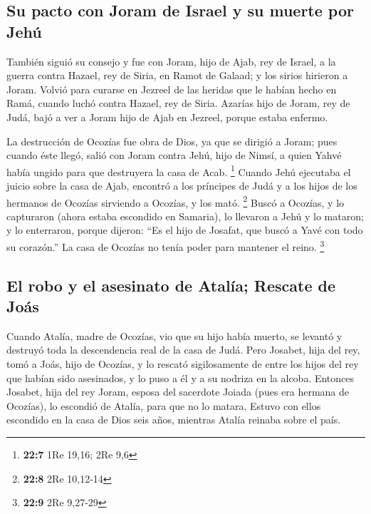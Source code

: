\hypertarget{su-pacto-con-joram-de-israel-y-su-muerte-por-jehuxfa}{%
\subsection{Su pacto con Joram de Israel y su muerte por
Jehú}\label{su-pacto-con-joram-de-israel-y-su-muerte-por-jehuxfa}}

 También siguió su consejo y fue con Joram, hijo de Ajab,
rey de Israel, a la guerra contra Hazael, rey de Siria, en Ramot de
Galaad; y los sirios hirieron a Joram.  Volvió para
curarse en Jezreel de las heridas que le habían hecho en Ramá, cuando
luchó contra Hazael, rey de Siria. Azarías hijo de Joram, rey de Judá,
bajó a ver a Joram hijo de Ajab en Jezreel, porque estaba enfermo.

 La destrucción de Ocozías fue obra de Dios, ya que se
dirigió a Joram; pues cuando éste llegó, salió con Joram contra Jehú,
hijo de Nimsí, a quien Yahvé había ungido para que destruyera la casa de
Acab. \footnote{\textbf{22:7} 1Re 19,16; 2Re 9,6}  Cuando
Jehú ejecutaba el juicio sobre la casa de Ajab, encontró a los príncipes
de Judá y a los hijos de los hermanos de Ocozías sirviendo a Ocozías, y
los mató. \footnote{\textbf{22:8} 2Re 10,12-14}  Buscó a
Ocozías, y lo capturaron (ahora estaba escondido en Samaria), lo
llevaron a Jehú y lo mataron; y lo enterraron, porque dijeron: ``Es el
hijo de Josafat, que buscó a Yavé con todo su corazón.'' La casa de
Ocozías no tenía poder para mantener el reino. \footnote{\textbf{22:9}
  2Re 9,27-29}

\hypertarget{el-robo-y-el-asesinato-de-ataluxeda-rescate-de-jouxe1s}{%
\subsection{El robo y el asesinato de Atalía; Rescate de
Joás}\label{el-robo-y-el-asesinato-de-ataluxeda-rescate-de-jouxe1s}}

 Cuando Atalía, madre de Ocozías, vio que su hijo había
muerto, se levantó y destruyó toda la descendencia real de la casa de
Judá.  Pero Josabet, hija del rey, tomó a Joás, hijo de
Ocozías, y lo rescató sigilosamente de entre los hijos del rey que
habían sido asesinados, y lo puso a él y a su nodriza en la alcoba.
Entonces Josabet, hija del rey Joram, esposa del sacerdote Joiada (pues
era hermana de Ocozías), lo escondió de Atalía, para que no lo matara.
 Estuvo con ellos escondido en la casa de Dios seis años,
mientras Atalía reinaba sobre el país.


